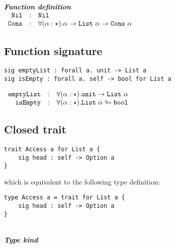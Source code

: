 \documentclass{article}[11pt]
\newcommand{\subsubsubsection}[1]
{
    ~\\
    {\bf {\em #1}} \\
}
\newcommand{\term}[1]{\verb~#1~}
\begin{document}
    \subsubsubsection{Function definition}

    \noindent
    \begin{math}
        \begin{array}{rclp{5cm}}
            \term{Nil}  & : & \term{Nil}                                                                                   \\
            \term{Cons} & : & \forall(\alpha:\star).\alpha \rightarrow \term{List}~\alpha \rightarrow \term{Cons} ~ \alpha \\
        \end{array}
    \end{math}

    \subsection{Function signature}\label{subsec:function-signature}

    \begin{verbatim}
sig emptyList : forall a. unit -> List a
sig isEmpty : forall a. self -> bool for List a
    \end{verbatim}

    \noindent
    \begin{math}
        \begin{array}{rclp{5cm}}
            \term{emptyList} & : & \forall(\alpha:\star).\term{unit} \rightarrow \term{List}~\alpha     \\
            \term{isEmpty}   & : & \forall(\alpha:\star).\term{List}~\alpha \looparrowright \term{bool}
        \end{array}
    \end{math}

    \subsection{Closed trait}\label{subsec:closed-trait}

    \begin{verbatim}
trait Access a for List a {
    sig head : self -> Option a
}
    \end{verbatim}

    which is equivalent to the following type definition:

    \begin{verbatim}
type Access a = trait for List a {
    sig head : self -> Option a
}
    \end{verbatim}

    \subsubsubsection{Type kind}
\end{document}
